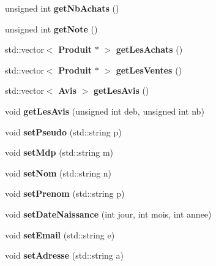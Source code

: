 \begin{DoxyCompactItemize}
\item 
unsigned int {\bfseries get\-Nb\-Achats} ()\label{class_utilisateur_a5fd1e4951abad29ba9ae1ac8760c726d}

\item 
unsigned int {\bfseries get\-Note} ()\label{class_utilisateur_a2727eb739e0065c9aac277b5d2703b7e}

\item 
std\-::vector$<$ {\bf Produit} $\ast$ $>$ {\bfseries get\-Les\-Achats} ()\label{class_utilisateur_ae3b7946578854df50bd2300ee2f04bdf}

\item 
std\-::vector$<$ {\bf Produit} $\ast$ $>$ {\bfseries get\-Les\-Ventes} ()\label{class_utilisateur_a76ac94b07263ba9bc902c69c5e0a4de1}

\item 
std\-::vector$<$ {\bf Avis} $>$ {\bfseries get\-Les\-Avis} ()\label{class_utilisateur_a8e5721905dee5dea491c7a0c8811aaa0}

\item 
void {\bfseries get\-Les\-Avis} (unsigned int deb, unsigned int nb)\label{class_utilisateur_af62b73aa8bca25a0aa3466339d6a97d3}

\item 
void {\bfseries set\-Pseudo} (std\-::string p)\label{class_utilisateur_a8463c077b33ccc93c8e424a47b9bc369}

\item 
void {\bfseries set\-Mdp} (std\-::string m)\label{class_utilisateur_a34f6a4cd57807390db2bfc3f880eec58}

\item 
void {\bfseries set\-Nom} (std\-::string n)\label{class_utilisateur_a20a32b47f2b080a4aead49e16bd06f44}

\item 
void {\bfseries set\-Prenom} (std\-::string p)\label{class_utilisateur_a82c09ccdcb2449ee5a9938bb716938b6}

\item 
void {\bfseries set\-Date\-Naissance} (int jour, int mois, int annee)\label{class_utilisateur_a9cb5da21a0fa7c2900c95dfb9b6c70e8}

\item 
void {\bfseries set\-Email} (std\-::string e)\label{class_utilisateur_ab2e9b7718ba138421d5de19d29131165}

\item 
void {\bfseries set\-Adresse} (std\-::string a)\label{class_utilisateur_afd7d9b7465cf7f0884e8701d785bd6c2}


\end{DoxyCompactItemize}
